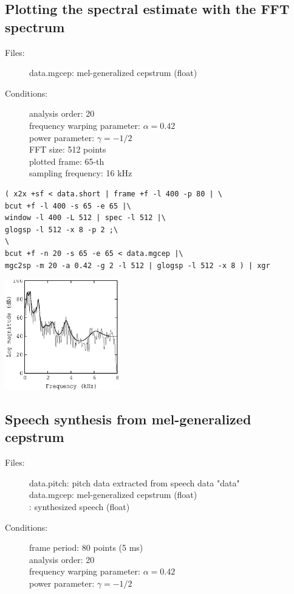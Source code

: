 \documentclass[a4paper,10pt]{article}
\begin{document}
\subsection{Plotting the spectral estimate with the FFT spectrum}

\begin{description}
\item[Files:]
  data.mgcep: mel-generalized cepstrum (float)
\item[Conditions:]
  analysis order: 20\\
  frequency warping parameter: $\alpha = 0.42$\\
  power parameter: $\gamma = -1/2$\\
  FFT size: 512 points\\
  plotted frame: 65-th\\
  sampling frequency: 16 kHz
\end{description}

\begin{verbatim}
( x2x +sf < data.short | frame +f -l 400 -p 80 | \
bcut +f -l 400 -s 65 -e 65 |\
window -l 400 -L 512 | spec -l 512 |\
glogsp -l 512 -x 8 -p 2 ;\
\
bcut +f -n 20 -s 65 -e 65 < data.mgcep |\
mgc2sp -m 20 -a 0.42 -g 2 -l 512 | glogsp -l 512 -x 8 ) | xgr
\end{verbatim}

\includegraphics[width=5cm]{eps/data.mgcep.glogsp.eps}

\subsection{Speech synthesis from mel-generalized cepstrum}

\begin{description}
\item[Files:]
  data.pitch: pitch data extracted from speech data "data"\\
  data.mgcep: mel-generalized cepstrum (float)\\
    :
  synthesized speech (float)
\item[Conditions:]
  frame period: 80 points (5 ms)\\
  analysis order: 20\\
  frequency warping parameter: $\alpha = 0.42$\\
  power parameter: $\gamma = -1/2$
\end{description}
\end{document}
